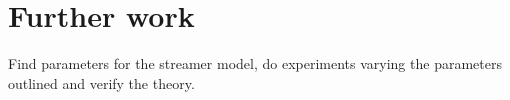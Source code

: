 \section{Further work}
Find parameters for the streamer model, do experiments varying the parameters outlined and verify the theory.